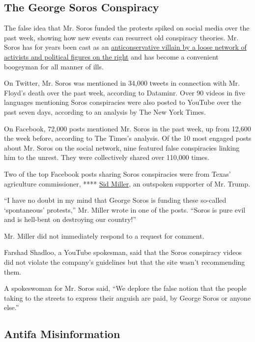 \hypertarget{the-george-soros-conspiracy}{%
\subsection{The George Soros
Conspiracy}\label{the-george-soros-conspiracy}}

The false idea that Mr. Soros funded the protests spiked on social media
over the past week, showing how new events can resurrect old conspiracy
theories. Mr. Soros has for years been cast as an
\href{https://www.nytimes.com/2018/05/29/us/roseanne-george-soros-twitter.html}{anticonservative
villain by a loose network of activists and political figures on the
right} and has become a convenient boogeyman for all manner of ills.

On Twitter, Mr. Soros was mentioned in 34,000 tweets in connection with
Mr. Floyd's death over the past week, according to Dataminr. Over 90
videos in five languages mentioning Soros conspiracies were also posted
to YouTube over the past seven days, according to an analysis by The New
York Times.

On Facebook, 72,000 posts mentioned Mr. Soros in the past week, up from
12,600 the week before, according to The Times's analysis. Of the 10
most engaged posts about Mr. Soros on the social network, nine featured
false conspiracies linking him to the unrest. They were collectively
shared over 110,000 times.

Two of the top Facebook posts sharing Soros conspiracies were from
Texas' agriculture commissioner, ****
\href{https://www.facebook.com/MillerForTexas/}{Sid Miller}, an
outspoken supporter of Mr. Trump.

``I have no doubt in my mind that George Soros is funding these
so-called `spontaneous' protests,'' Mr. Miller wrote in one of the
posts. ``Soros is pure evil and is hell-bent on destroying our
country!''

Mr. Miller did not immediately respond to a request for comment.

Farshad Shadloo, a YouTube spokesman, said that the Soros conspiracy
videos did not violate the company's guidelines but that the site wasn't
recommending them.

A spokeswoman for Mr. Soros said, ``We deplore the false notion that the
people taking to the streets to express their anguish are paid, by
George Soros or anyone else.''

\hypertarget{antifa-misinformation}{%
\subsection{Antifa Misinformation}\label{antifa-misinformation}}

